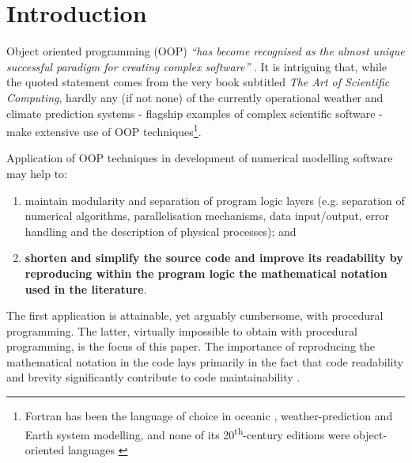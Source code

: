 \documentclass[twocolumn]{article}
\begin{document}
  \section{Introduction}

  Object oriented programming (OOP) {\em ``has become recognised as the almost unique successful 
    paradigm for creating complex software''} \citep[][Sec.~1.3]{Press_et_al_2007}.
  It is intriguing that, while the quoted statement comes from the very book subtitled 
   {\em The Art of Scientific Computing}, hardly any (if not none) of the currently operational 
    weather and climate prediction systems - flagship examples of complex scientific software - 
    make extensive use of OOP techniques\footnote{
  Fortran has been the language of choice in oceanic \citep{Griffies_et_al_2000}, 
    weather-prediction \citep{Sundberg_2009} and Earth system \citep{Legutke_2012} modelling, 
    and none of its 20\textsuperscript{th}-century editions were object-oriented languages \citep[see e.g.][for discussion]{Norton_et_al_2007}}.

  Application of OOP techniques in development of numerical modelling software may help to:
  \begin{enumerate}[label=(\roman*), leftmargin=*, widest=ii]
    \item{maintain modularity and separation of program logic layers (e.g. separation of
      numerical algorithms, parallelisation mechanisms, data input/output, error handling and
      the description of physical processes); and}
    \item{{\bf shorten and simplify the source code and improve its readability by reproducing within 
      the program logic the mathematical notation used in the literature}.}
  \end{enumerate}
  The first application is attainable, yet arguably cumbersome, with procedural programming.
  The latter, virtually impossible to obtain with procedural programming, is the focus of this paper.
  The importance of reproducing the mathematical notation in the code lays primarily
    in the fact that code readability and brevity 
    significantly contribute to code maintainability \citep{Wilson_et_al_2012}.
\end{document}

